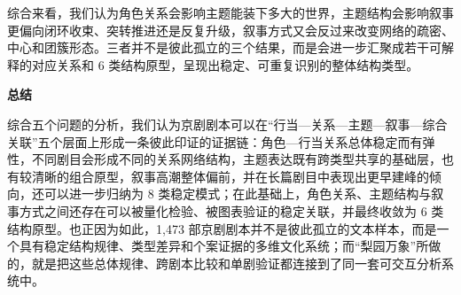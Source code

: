 \documentclass[12pt, a4paper]{article}
\begin{document}
{\fontsize{12bp}{20bp}\kaishu
综合来看，我们认为角色关系会影响主题能装下多大的世界，主题结构会影响叙事更偏向闭环收束、突转推进还是反复升级，叙事方式又会反过来改变网络的疏密、中心和团簇形态。三者并不是彼此孤立的三个结果，而是会进一步汇聚成若干可解释的对应关系和 6 类结构原型，呈现出稳定、可重复识别的整体结构类型。
}



{\fontsize{14bp}{22bp}\heiti\bfseries 总结}


{\fontsize{12bp}{20bp}\kaishu
综合五个问题的分析，我们认为京剧剧本可以在“行当—关系—主题—叙事—综合关联”五个层面上形成一条彼此印证的证据链：角色—行当关系总体稳定而有弹性，不同剧目会形成不同的关系网络结构，主题表达既有跨类型共享的基础层，也有较清晰的组合原型，叙事高潮整体偏前，并在长篇剧目中表现出更早建峰的倾向，还可以进一步归纳为 8 类稳定模式；在此基础上，角色关系、主题结构与叙事方式之间还存在可以被量化检验、被图表验证的稳定关联，并最终收敛为 6 类结构原型。也正因为如此，1{,}473 部京剧剧本并不是彼此孤立的文本样本，而是一个具有稳定结构规律、类型差异和个案证据的多维文化系统；而“梨园万象”所做的，就是把这些总体规律、跨剧本比较和单剧验证都连接到了同一套可交互分析系统中。
}
\end{document}
